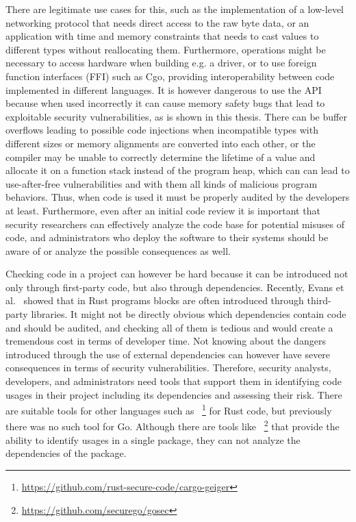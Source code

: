 There are legitimate use cases for this, such as the implementation of a low-level networking protocol that needs
direct access to the raw byte data, or an application with time and memory constraints that needs to cast values to
different types without reallocating them.
Furthermore, \unsafe{} operations might be necessary to access hardware when building e.g. a driver, or to use
foreign function interfaces (\acrshort{FFI}) such as Cgo, providing interoperability between code implemented in
different languages.
It is however dangerous to use the \unsafe{} \acrshort{API} because when used incorrectly it can cause memory safety
bugs that lead to exploitable security vulnerabilities, as is shown in this thesis.
There can be buffer overflows leading to possible code injections when incompatible types with different sizes or
memory alignments are converted into each other, or the compiler may be unable to correctly determine the lifetime of
a value and allocate it on a function stack instead of the program heap, which can can lead to use-after-free
vulnerabilities and with them all kinds of malicious program behaviors.
Thus, when \unsafe{} code is used it must be properly audited by the developers at least.
Furthermore, even after an initial code review it is important that security researchers can effectively analyze the
code base for potential misuses of \unsafe{} code, and administrators who deploy the software to their systems should
be aware of or analyze the possible consequences as well.

Checking \unsafe{} code in a project can however be hard because it can be introduced not only through first-party
code, but also through dependencies.
Recently, Evans et al.~\cite{evans2020} showed that in Rust programs \unsafe{} blocks are often introduced through
third-party libraries.
It might not be directly obvious which dependencies contain \unsafe{} code and should be audited, and checking all of
them is tedious and would create a tremendous cost in terms of developer time.
Not knowing about the dangers introduced through the use of external dependencies can however have severe consequences
in terms of security vulnerabilities.
Therefore, security analysts, developers, and administrators need tools that support them in identifying \unsafe{}
code usages in their project including its dependencies and assessing their risk.
There are suitable tools for other languages such as
\toolCargoGeiger{}~\footnote{\url{https://github.com/rust-secure-code/cargo-geiger}} for Rust code, but previously there
was no such tool for Go.
Although there are tools like \toolGosec{}~\footnote{\url{https://github.com/securego/gosec}} that provide the ability
to identify \unsafe{} usages in a single package, they can not analyze the dependencies of the package.


